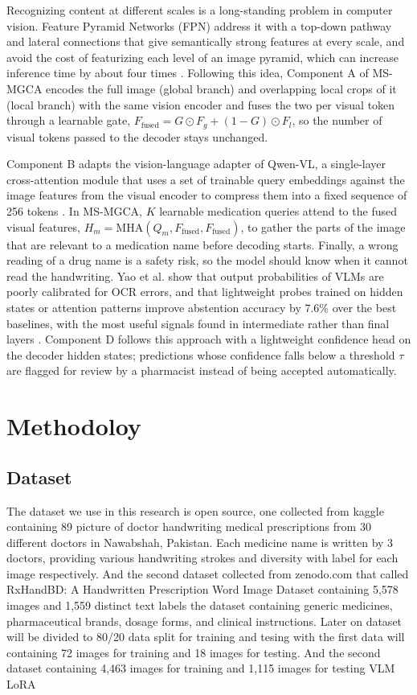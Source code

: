 \documentclass[conference, a4paper]{IEEEtran}
\begin{document}
Recognizing content at different scales is a long-standing problem in computer vision. Feature Pyramid Networks (FPN) address it with a top-down pathway and lateral connections that give semantically strong features at every scale, and avoid the cost of featurizing each level of an image pyramid, which can increase inference time by about four times \cite{lin2017feature}. Following this idea, Component A of MS-MGCA encodes the full image (global branch) and overlapping local crops of it (local branch) with the same vision encoder and fuses the two per visual token through a learnable gate, $F_{\text{fused}} = G \odot F_g + (1-G) \odot F_l$, so the number of visual tokens passed to the decoder stays unchanged.

Component B adapts the vision-language adapter of Qwen-VL, a single-layer cross-attention module that uses a set of trainable query embeddings against the image features from the visual encoder to compress them into a fixed sequence of 256 tokens \cite{bai2023qwenvl}. In MS-MGCA, $K$ learnable medication queries attend to the fused visual features, $H_m = \mathrm{MHA}(Q_m, F_{\text{fused}}, F_{\text{fused}})$, to gather the parts of the image that are relevant to a medication name before decoding starts. Finally, a wrong reading of a drug name is a safety risk, so the model should know when it cannot read the handwriting. Yao et al. show that output probabilities of VLMs are poorly calibrated for OCR errors, and that lightweight probes trained on hidden states or attention patterns improve abstention accuracy by 7.6\% over the best baselines, with the most useful signals found in intermediate rather than final layers \cite{yao2025reading}. Component D follows this approach with a lightweight confidence head on the decoder hidden states; predictions whose confidence falls below a threshold $\tau$ are flagged for review by a pharmacist instead of being accepted automatically.

\section{Methodoloy}

\subsection{Dataset}
The dataset we use in this research is open source, one collected from kaggle containing 89 picture of doctor handwriting medical prescriptions from 30 different doctors in Nawabshah, Pakistan. Each medicine name is written by 3 doctors, providing various handwriting strokes and diversity with label for each image respectively. And the second dataset collected from zenodo.com that called RxHandBD: A Handwritten Prescription Word Image Dataset containing  5,578 images and 1,559 distinct text labels the dataset containing generic medicines, pharmaceutical brands, dosage forms, and clinical instructions. Later on dataset will be divided to 80/20 data split for training and tesing with the first data will containing 72 images for training and 18 images for testing. And the second dataset containing 4,463 images for training and 1,115 images for testing
VLM
LoRA
\end{document}
